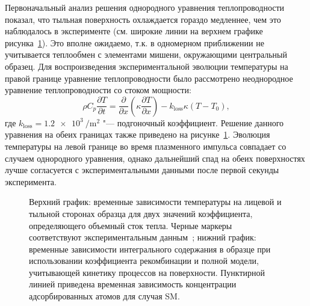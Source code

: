 Первоначальный анализ решения однородного уравнения теплопроводности показал, что тыльная поверхность охлаждается гораздо медленнее, чем это наблюдалось в эксперименте (см. широкие линии на верхнем графике рисунка~\cref{fig:ch3/QSPA_T_ret}). Это вполне ожидаемо, т.к. в одномерном приближении не учитывается теплообмен с элементами мишени, окружающими центральный образец. Для воспроизведения экспериментальной эволюции температуры на правой границе уравнение теплопроводности было рассмотрено неоднородное уравнение теплопроводности со стоком мощности:
\begin{equation}
	\label{eq:ch3/QSPA_heat_transfer}
	\rho C_p \frac{\partial T}{ \partial t} = \frac{\partial}{\partial x}\left( \kappa \frac{\partial T}{\partial x} \right)  - k_\mathrm{loss} \kappa \left( T-T_0 \right),
\end{equation}
где \( k_\mathrm{loss}=\SI{1.2e3}{\per\meter\squared} \) "--- подгоночный коэффициент. Решение данного уравнения на обеих границах также приведено на рисунке~\cref{fig:ch3/QSPA_T_ret}. Эволюция температуры на левой границе во время плазменного импульса совпадает со случаем однородного уравнения, однако дальнейший спад на обеих поверхностях лучше согласуется с экспериментальными данными после первой секунды эксперимента.

\begin{figure}[ht]
	\caption{Верхний график: временные зависимости температуры на лицевой и тыльной сторонах образца для двух значений коэффициента, определяющего объемный сток тепла. Черные маркеры соответствуют экспериментальным данным~\cite{Poskakalov2020}; нижний график: временные зависимости интегрального содержания в образце при использовании коэффициента рекомбинации и полной модели, учитывающей кинетику процессов на поверхности. Пунктирной линией приведена временная зависимость концентрации адсорбированных атомов для случая SM. }\label{fig:ch3/QSPA_T_ret}
\end{figure}

